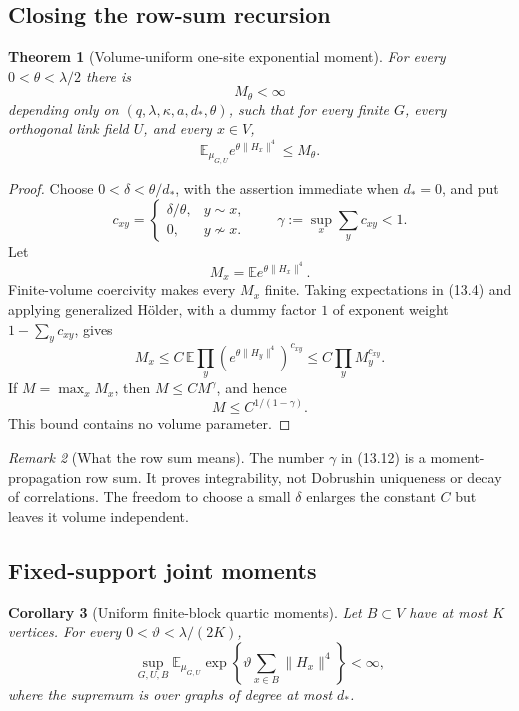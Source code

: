 \documentclass[11pt]{article}
\newtheorem{theorem}{Theorem}[section]
\newtheorem{corollary}[theorem]{Corollary}
\theoremstyle{remark}
\newtheorem{remark}[theorem]{Remark}
\begin{document}
\subsection{Closing the row-sum recursion}

\begin{theorem}[Volume-uniform one-site exponential moment]
\label{thm:v17v13-uniform}
For every \(0<\theta<\lambda/2\) there is
\[
 M_\theta<\infty                                      \tag{13.10}
\]
depending only on
\((q,\lambda,\kappa,a,d_*,\theta)\), such that for every finite
\(G\), every orthogonal link field \(U\), and every \(x\in V\),
\[
 \mathbb E_{\mu_{G,U}}e^{\theta\|H_x\|^4}
 \leq M_\theta.                                      \tag{13.11}
\]
\end{theorem}

\begin{proof}
Choose \(0<\delta<\theta/d_*\), with the assertion immediate when
\(d_*=0\), and put
\[
 c_{xy}=
 \begin{cases}
 \delta/\theta,&y\sim x,\\
 0,&y\not\sim x.
 \end{cases}
 \qquad
 \gamma:=\sup_x\sum_yc_{xy}<1.                     \tag{13.12}
\]
Let
\[
 M_x=\mathbb E e^{\theta\|H_x\|^4}.
\]
Finite-volume coercivity makes every \(M_x\) finite.  Taking
expectations in (13.4) and applying generalized H\"older, with a
dummy factor \(1\) of exponent weight \(1-\sum_yc_{xy}\), gives
\[
 M_x
 \leq C\,
 \mathbb E\prod_y
 \left(e^{\theta\|H_y\|^4}\right)^{c_{xy}}
 \leq C\prod_yM_y^{c_{xy}}.                       \tag{13.13}
\]
If \(M=\max_xM_x\), then \(M\leq CM^\gamma\), and hence
\[
 M\leq C^{1/(1-\gamma)}.                           \tag{13.14}
\]
This bound contains no volume parameter.
\end{proof}

\begin{remark}[What the row sum means]
\label{rem:v17v13-not-uniqueness}
The number \(\gamma\) in (13.12) is a moment-propagation row sum.
It proves integrability, not Dobrushin uniqueness or decay of
correlations.  The freedom to choose a small \(\delta\) enlarges
the constant \(C\) but leaves it volume independent.
\end{remark}

\subsection{Fixed-support joint moments}

\begin{corollary}[Uniform finite-block quartic moments]
\label{cor:v17v13-block}
Let \(B\subset V\) have at most \(K\) vertices.  For every
\(0<\vartheta<\lambda/(2K)\),
\[
 \sup_{G,U,B}
 \mathbb E_{\mu_{G,U}}
 \exp\left\{\vartheta\sum_{x\in B}\|H_x\|^4\right\}
 <\infty,                                           \tag{13.15}
\]
where the supremum is over graphs of degree at most \(d_*\).
\end{corollary}
\end{document}
